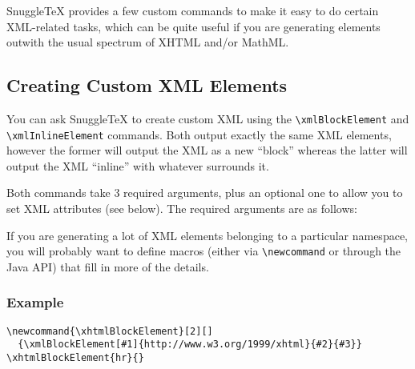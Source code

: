 
SnuggleTeX provides a few custom commands to make it
easy to do certain XML-related tasks, which can be quite
useful if you are generating elements outwith the usual
spectrum of XHTML and/or MathML.

\subsection*{Creating Custom XML Elements}

You can ask SnuggleTeX to create custom XML using the
\verb|\xmlBlockElement| and \verb|\xmlInlineElement|
commands. Both output exactly the same XML elements, however the former will
output the XML as a new ``block'' whereas the latter will output the XML
``inline'' with whatever surrounds it.

Both commands take 3 required arguments, plus an
optional one to allow you to set XML attributes
(see below). The required arguments are as follows:


If you are generating a lot of XML elements belonging
to a particular namespace, you will probably want to
define macros (either via \verb|\newcommand| or
through the Java API) that fill in more of the details.

\subsubsection*{Example}

\begin{verbatim}
\newcommand{\xhtmlBlockElement}[2][]
  {\xmlBlockElement[#1]{http://www.w3.org/1999/xhtml}{#2}{#3}}
\xhtmlBlockElement{hr}{}
\end{verbatim}

